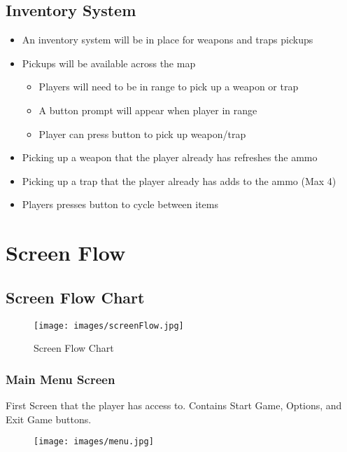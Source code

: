 \documentclass[10pt]{report}
\begin{document}
\subsection{Inventory System}

\begin{itemize}
    \item An inventory system will be in place for weapons and traps pickups
    \item Pickups will be available across the map 
    \begin{itemize}
        \item Players will need to be in range to pick up a weapon or trap
        \item A button prompt will appear when player in range
        \item Player can press button to pick up weapon/trap
    \end{itemize}
    \item Picking up a weapon that the player already has refreshes the ammo
    \item Picking up a trap that the player already has adds to the ammo (Max 4)
    \item Players presses button to cycle between items    
\end{itemize}

\section{Screen Flow}

\subsection{Screen Flow Chart}

\begin{figure}[H]
    \centering
    \texttt{[image: images/screenFlow.jpg]}
    \caption{Screen Flow Chart}
\end{figure}

\subsubsection{Main Menu Screen}

First Screen that the player has access to. Contains Start Game, Options, and Exit Game buttons.

\begin{figure}[H]
    \centering
    \texttt{[image: images/menu.jpg]}
    \caption{}
\end{figure}
\end{document}
